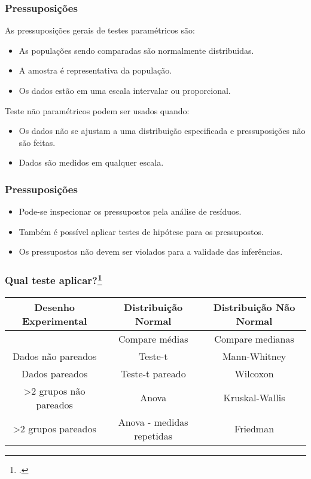 \documentclass{beamer}
\begin{document}
\begin{frame}
\frametitle{Pressuposições}
As pressuposições gerais de testes paramétricos são:
\begin{itemize}
\item As populações sendo comparadas são normalmente distribuidas.
\item A amostra é representativa da população.
\item Os dados estão em uma escala intervalar ou proporcional.
\end{itemize}
Teste não paramétricos podem ser usados quando:
\begin{itemize}
\item Os dados não se ajustam a uma distribuição especificada e pressuposições não são feitas.
\item Dados são medidos em qualquer escala.
\end{itemize}


\end{frame}

\begin{frame}
\frametitle{Pressuposições}

\begin{itemize}
\item Pode-se inspecionar os pressupostos pela análise de resíduos.
\item Também é possível aplicar testes de hipótese para os pressupostos.
\item Os pressupostos não devem ser violados para a validade das inferências.
\end{itemize}

\end{frame}

\begin{frame}
\frametitle{Qual teste aplicar?\footcite{vinaixa2012guideline}}

\begin{table}[h]
\fontsize{9pt}{9pt}\selectfont
\centering
\begin{tabular}{ccc}
\hline
 Desenho Experimental & Distribuição Normal & Distribuição Não Normal    \\
\hline
 &  Compare médias & Compare medianas   \\
Dados não pareados & Teste-t & Mann-Whitney   \\
Dados pareados & Teste-t pareado & Wilcoxon \\
>2 grupos não pareados & Anova & Kruskal-Wallis \\
>2 grupos pareados & Anova - medidas repetidas & Friedman \\
\hline
\end{tabular}

\end{table}
\end{frame}
\end{document}
